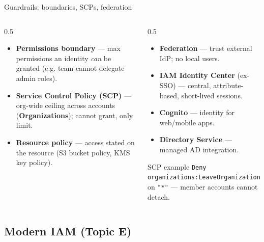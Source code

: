 \documentclass[aspectratio=169,10pt]{beamer}
\newcommand{\svc}[1]{{\color{accent}\textsf{\textbf{#1}}}}      %
\newcommand{\term}[1]{{\color{awsink}\textbf{#1}}}
\begin{document}
\begin{frame}{Guardrails: boundaries, SCPs, federation}
  \footnotesize
  \begin{columns}[T]
    \begin{column}{0.5\textwidth}
      \begin{itemize}
        \item \term{Permissions boundary} --- max permissions an identity \emph{can} be granted
              (e.g. team cannot delegate admin roles).
        \item \term{Service Control Policy (SCP)} --- org-wide ceiling across accounts
              (\svc{Organizations}); cannot grant, only limit.
        \item \term{Resource policy} --- access stated on the resource (S3 bucket policy, KMS key policy).
      \end{itemize}
    \end{column}
    \begin{column}{0.5\textwidth}
      \begin{itemize}
        \item \term{Federation} --- trust external IdP; no local users.
        \item \svc{IAM Identity Center} (ex-SSO) --- central, attribute-based, short-lived sessions.
        \item \svc{Cognito} --- identity for web/mobile apps.
        \item \svc{Directory Service} --- managed AD integration.
      \end{itemize}
      \begin{block}{\footnotesize SCP example}
        \scriptsize \texttt{Deny organizations:LeaveOrganization} on \texttt{"*"}
        --- member accounts cannot detach.
      \end{block}
    \end{column}
  \end{columns}
\end{frame}

\subsection{Modern IAM (Topic E)}
\end{document}
